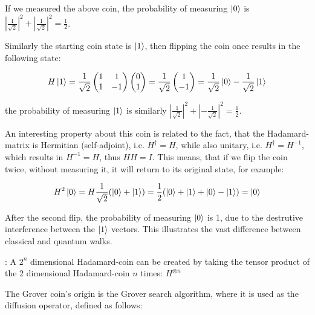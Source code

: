 If we measured the above coin, the probability of measuring $\ket{0}$ is $\left\lvert\frac{1}{\sqrt{2}}\right\rvert^2 + \left\lvert\frac{1}{\sqrt{2}}\right\rvert^2 = \frac{1}{2}$.

Similarly the starting coin state is $\ket{1}$, then flipping the coin once results in the following state:

\begin{align}
   H\ket{1} = \frac{1}{\sqrt{2}}\begin{pmatrix}
      1 & 1  \\
      1 & -1
    \end{pmatrix} \begin{pmatrix} 0 \\ 1 \end{pmatrix}
    = \frac{1}{\sqrt{2}} \begin{pmatrix} 1 \\ -1 \end{pmatrix} = \frac{1}{\sqrt{2}} \ket{0} - \frac{1}{\sqrt{2}} \ket{1}
\end{align}

the probability of measuring $\ket{1}$ is similarly $\left\lvert\frac{1}{\sqrt{2}}\right\rvert^2 + \left\lvert-\frac{1}{\sqrt{2}}\right\rvert^2 = \frac{1}{2}$.

An interesting property about this coin is related to the fact, that the Hadamard-matrix is Hermitian (self-adjoint), i.e. $H^{\dagger} = H$, while also unitary, i.e. $H^{\dagger} = H^{-1}$, which results in $H^{-1} = H$, thus $HH = I$. This means, that if we flip the coin twice, without measuring it, it will return to its original state, for example:

\begin{align}
 H^2 \ket{0} = H\frac{1}{\sqrt{2}}(\ket{0} + \ket{1}) = \frac{1}{2}(\ket{0} + \ket{1} + \ket{0} - \ket{1}) = \ket{0}
\end{align}

After the second flip, the probability of measuring $\ket{0}$ is 1, due to the destrutive interference between the $\ket{1}$ vectors. This illustrates the vast difference between classical and quantum walks.

: A $2^n$ dimensional Hadamard-coin can be created by taking the tensor product of the $2$ dimensional Hadamard-coin $n$ times: $H^{\otimes{}n}$




The Grover coin's origin is the Grover search algorithm, where it is used as the diffusion operator, defined as follows:

